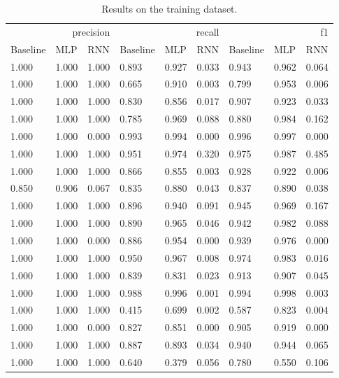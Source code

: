 \begin{table}
\caption{Results on the training dataset.}
\label{tab::ex_2_train}
\begin{tabular}{|l||l||l||l||l||l||l||l||l|}
\toprule
\multicolumn{3}{r}{precision} & \multicolumn{3}{r}{recall} & \multicolumn{3}{r}{f1} \\
Baseline & MLP & RNN & Baseline & MLP & RNN & Baseline & MLP & RNN \\
\midrule
1.000 & 1.000 & 1.000 & 0.893 & 0.927 & 0.033 & 0.943 & 0.962 & 0.064 \\
1.000 & 1.000 & 1.000 & 0.665 & 0.910 & 0.003 & 0.799 & 0.953 & 0.006 \\
1.000 & 1.000 & 1.000 & 0.830 & 0.856 & 0.017 & 0.907 & 0.923 & 0.033 \\
1.000 & 1.000 & 1.000 & 0.785 & 0.969 & 0.088 & 0.880 & 0.984 & 0.162 \\
1.000 & 1.000 & 0.000 & 0.993 & 0.994 & 0.000 & 0.996 & 0.997 & 0.000 \\
1.000 & 1.000 & 1.000 & 0.951 & 0.974 & 0.320 & 0.975 & 0.987 & 0.485 \\
1.000 & 1.000 & 1.000 & 0.866 & 0.855 & 0.003 & 0.928 & 0.922 & 0.006 \\
0.850 & 0.906 & 0.067 & 0.835 & 0.880 & 0.043 & 0.837 & 0.890 & 0.038 \\
1.000 & 1.000 & 1.000 & 0.896 & 0.940 & 0.091 & 0.945 & 0.969 & 0.167 \\
1.000 & 1.000 & 1.000 & 0.890 & 0.965 & 0.046 & 0.942 & 0.982 & 0.088 \\
1.000 & 1.000 & 0.000 & 0.886 & 0.954 & 0.000 & 0.939 & 0.976 & 0.000 \\
1.000 & 1.000 & 1.000 & 0.950 & 0.967 & 0.008 & 0.974 & 0.983 & 0.016 \\
1.000 & 1.000 & 1.000 & 0.839 & 0.831 & 0.023 & 0.913 & 0.907 & 0.045 \\
1.000 & 1.000 & 1.000 & 0.988 & 0.996 & 0.001 & 0.994 & 0.998 & 0.003 \\
1.000 & 1.000 & 1.000 & 0.415 & 0.699 & 0.002 & 0.587 & 0.823 & 0.004 \\
1.000 & 1.000 & 0.000 & 0.827 & 0.851 & 0.000 & 0.905 & 0.919 & 0.000 \\
1.000 & 1.000 & 1.000 & 0.887 & 0.893 & 0.034 & 0.940 & 0.944 & 0.065 \\
1.000 & 1.000 & 1.000 & 0.640 & 0.379 & 0.056 & 0.780 & 0.550 & 0.106 \\
\bottomrule
\end{tabular}
\end{table}
